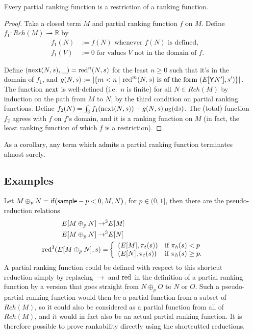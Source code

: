 \begin{theorem} \label{thm:partial implies rankable}
Every partial ranking function is a restriction of a ranking function.
\end{theorem}
\begin{proof}
Take a closed term $M$ and partial ranking function $f$ on $M$. Define $f_1 : Rch(M) \rightharpoonup \mathbb R$ by
\begin{align*}
    f_1(N) & := f(N) \text{ whenever $f(N)$ is defined,} \\
    f_1(V) & := 0 \text{ for values $V$ not in the domain of $f$.}
\end{align*}

Define $(\operatorname{next}(N,s),\_) = \operatorname{red}^n(N,s)$ for the least $n \geq 0$ such that it's in the domain of $f_1$, and $g(N,s) := \left | \{m < n \mid \operatorname{red}^m(N,s) \text{ is of the form } (E[\mathsf{Y} N'],s') \} \right |$. 
The function $\operatorname{next}$ is well-defined (i.e.~$n$ is finite) for all $N \in Rch(M)$ by induction on the path from $M$ to $N$, by the third condition on partial ranking functions. Define $f_2(N) = \int_{\mathbb{S}} f_1(\operatorname{next}(N,s)) + g(N,s) \, \mu_{{\mathbb{S}}}(\mathrm d s)$. The (total) function $f_2$ agrees with $f$ on $f$'s domain, and it is a ranking function on $M$ (in fact, the least ranking function of which $f$ is a restriction).
\end{proof}


As a corollary, any term which admits a partial ranking function terminates almost surely.

\subsection{Examples}
Let $M \oplus_p N = \mathsf{if}(\mathsf{sample} - p < 0, M, N)$, for $p \in (0,1]$, then there are the pseudo-reduction relations
\begin{align*}
E[M \oplus_p N] \to^3 & E[M] & \\
E[M \oplus_p N] \to^3 & E[N] & \\
\operatorname{red}^3(E[M \oplus_p N], s) = & \left\{
    \begin{array}{ll}
        (E[M],\pi_t(s)) & \text{if } \pi_h(s) < p \\
        (E[N],\pi_t(s)) & \text{if } \pi_h(s) \geq p. \\
    \end{array} \right .
\end{align*}
A partial ranking function could be defined with respect to this shortcut reduction simply by replacing $\to$ and $\operatorname{red}$ in the definition of a partial ranking function by a version that goes straight from $N \oplus_p O$ to $N$ or $O$. Such a pseudo-partial ranking function would then be a partial function from a subset of $Rch(M)$, so it could also be considered as a partial function from all of $Rch(M)$, and it would in fact also be an actual partial ranking function. It is therefore possible to prove rankability directly using the shortcutted reductions.

